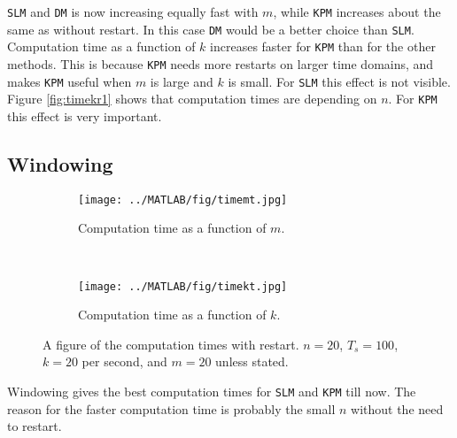 \noindent \texttt{SLM} and \texttt{DM} is now increasing equally fast with $m$, while \texttt{KPM} increases about the same as without restart. In this case \texttt{DM} would be a better choice than \texttt{SLM}.\\%

Computation time as a function of $k$ increases faster for \texttt{KPM} than for the other methods. This is because \texttt{KPM} needs more restarts on larger time domains, and makes \texttt{KPM} useful when $m$ is large and $k$ is small. For \texttt{SLM} this effect is not visible. \\
Figure \ref{fig:timekr1} shows that computation times are depending on $n$. For \texttt{KPM} this effect is very important. \\

\subsection{Windowing}
\begin{figure}[H]
        \centering
        \begin{subfigure}[b]{0.45\textwidth}
                \texttt{[image: ../MATLAB/fig/timemt.jpg]}
                \caption{ Computation time as a function of $m$. }
                \label{fig:timemt}
        \end{subfigure}
        ~
        \begin{subfigure}[b]{0.45\textwidth}
                \texttt{[image: ../MATLAB/fig/timekt.jpg]}
                \caption{ Computation time as a function of $k$. }
                \label{fig:timekt}
        \end{subfigure}
        \caption{ A figure of the computation times with restart. $n = 20$, $T_s = 100$, $k = 20$ per second, and $m = 20$ unless stated. }
        \label{fig:time2}
\end{figure}
Windowing gives the best computation times for \texttt{SLM} and \texttt{KPM} till now. %
The reason for the faster computation time is probably the small $n$ without the need to restart. 
